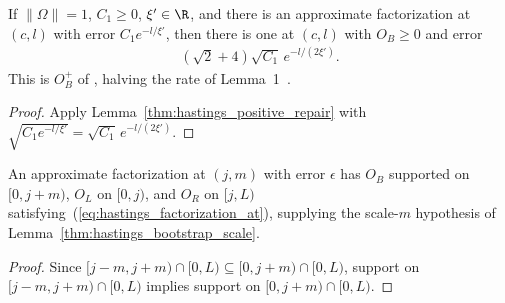 \begin{lemma}
    \label{thm:hastings_positive_factorization}
    \leanok
    If $\|\Omega\|=1$, $C_1\ge0$, $\xi'\in\R$, and there is an approximate
    factorization at $(c,l)$ with error $C_1e^{-l/\xi'}$, then there is one at
    $(c,l)$ with $O_B\ge0$ and error
    \begin{align}
        (\sqrt2+4)\sqrt{C_1}\,e^{-l/(2\xi')}.
        \label{eq:hastings_positive_factorization}
    \end{align}
    This is $O_B^+$ of \cite[lines 912--943]{Hastings2007AreaLaw}, halving the
    rate of Lemma~1~\cite{gap:hastings07_lemma1_positivity_rate}.
\end{lemma}
\begin{proof}\leanok
    Apply Lemma~\ref{thm:hastings_positive_repair} with
    $\sqrt{C_1e^{-l/\xi'}}=\sqrt{C_1}\,e^{-l/(2\xi')}$.
\end{proof}

\begin{lemma}
    \label{thm:hastings_factorization_bootstrap_form}
    \leanok
    An approximate factorization at $(j,m)$ with error $\epsilon$ has $O_B$
    supported on $\lbrack0,j+m)$, $O_L$ on $\lbrack0,j)$, and $O_R$ on $\lbrack j,L)$
    satisfying~(\ref{eq:hastings_factorization_at}), supplying the scale-$m$
    hypothesis of Lemma~\ref{thm:hastings_bootstrap_scale}.
\end{lemma}
\begin{proof}\leanok
    Since $\lbrack j-m,j+m)\cap\lbrack0,L)\subseteq\lbrack0,j+m)\cap\lbrack0,L)$, support on
    $\lbrack j-m,j+m)\cap\lbrack0,L)$ implies support on $\lbrack0,j+m)\cap\lbrack0,L)$.
\end{proof}
